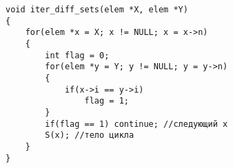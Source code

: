 \documentclass[a5paper]{article}
\begin{document}

\begin{lstlisting}
void iter_diff_sets(elem *X, elem *Y)
{
	for(elem *x = X; x != NULL; x = x->n)
	{
		int flag = 0;
		for(elem *y = Y; y != NULL; y = y->n)
		{
			if(x->i == y->i)
				flag = 1;
		}
		if(flag == 1) continue; //следующий x
		S(x); //тело цикла
	}
}
\end{lstlisting}
\end{document}

